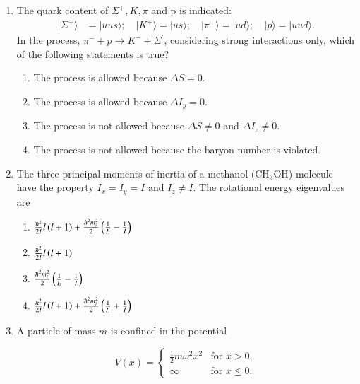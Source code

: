 \documentclass[journal]{IEEEtran}
\begin{document}
\begin{enumerate}[start=27]
\item The quark content of $\Sigma^+, K, \pi$ and p is indicated:
\begin{align*}
|\Sigma^+\rangle &= |uus\rangle; \quad |K^+\rangle = |us\rangle; \quad |\pi^+\rangle = |ud\rangle; \quad |p\rangle = |uud\rangle.
\end{align*}
In the process, $\pi^{-} + p \rightarrow K^{-} + \Sigma^{\prime}$, considering strong interactions only, which of the following statements is true?

\begin{enumerate}
    \item The process is allowed because $\Delta S = 0$.
    \item The process is allowed because $\Delta I_{y} = 0$.
    \item The process is not allowed because $\Delta S \neq 0$ and $\Delta I_{z} \neq 0$.
    \item The process is not allowed because the baryon number is violated.
\end{enumerate}

\item The three principal moments of inertia of a methanol (CH$_3$OH) molecule have the property $I_x = I_y = I$ and $I_z \neq I$. The rotational energy eigenvalues are
\begin{multicols}{2}
\begin{enumerate}
    \item $\frac{\hbar^2}{2I}l\left(l+1\right) + \frac{\hbar^2 m_i^2}{2}\left(\frac{1}{I_i} - \frac{1}{I}\right)$\\
    \item $\frac{\hbar^2}{2I}l\left(l+1\right)$
    \item $\frac{\hbar^2 m_i^2}{2}\left(\frac{1}{I_i} - \frac{1}{I}\right)$\\
    \item $\frac{\hbar^2}{2I}l\left(l+1\right) + \frac{\hbar^2 m_i^2}{2}\left(\frac{1}{I_i} + \frac{1}{I}\right)$
\end{enumerate}
\end{multicols}
\item A particle of mass $m$ is confined in the potential 

\begin{equation*}
V(x) = \begin{cases}
\frac{1}{2}m\omega^2 x^2 & \text{for } x > 0, \\
\infty & \text{for } x \leq 0.
\end{cases}
\end{equation*}


\end{enumerate}
\end{document}
